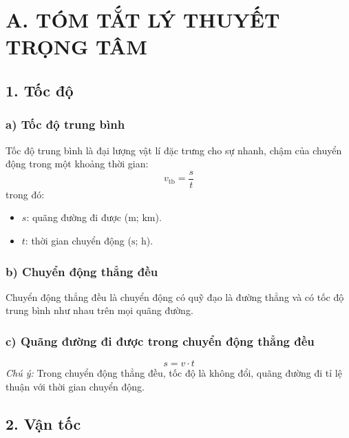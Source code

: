 
\section*{A. TÓM TẮT LÝ THUYẾT TRỌNG TÂM}

\subsection*{1. Tốc độ}

\subsubsection*{a) Tốc độ trung bình}
Tốc độ trung bình là đại lượng vật lí đặc trưng cho sự nhanh, chậm của chuyển động trong một khoảng thời gian:
\[
v_{\text{tb}} = \frac{s}{t}
\]
trong đó:
\begin{itemize}
    \item $s$: quãng đường đi được ($\text{m}$; $\text{km}$).
    \item $t$: thời gian chuyển động ($\text{s}$; $\text{h}$).
\end{itemize}

\subsubsection*{b) Chuyển động thẳng đều}
Chuyển động thẳng đều là chuyển động có quỹ đạo là đường thẳng và có tốc độ trung bình như nhau trên mọi quãng đường.

\subsubsection*{c) Quãng đường đi được trong chuyển động thẳng đều}
\[
s = v \cdot t
\]
\textit{Chú ý:} Trong chuyển động thẳng đều, tốc độ là không đổi, quãng đường đi tỉ lệ thuận với thời gian chuyển động.

\subsection*{2. Vận tốc}

